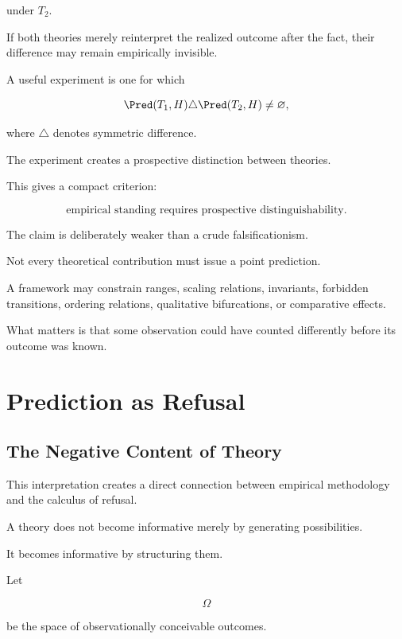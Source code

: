 \documentclass[11pt]{article}
\theoremstyle{remark}
\begin{document}
under $T_2$.

If both theories merely reinterpret the realized outcome after the fact, their difference may remain empirically invisible.

A useful experiment is one for which

\begin{equation}
\Pred(T_1,H)
\triangle
\Pred(T_2,H)
\neq
\varnothing,
\end{equation}

where $\triangle$ denotes symmetric difference.

The experiment creates a prospective distinction between theories.

This gives a compact criterion:

\begin{equation}
\boxed{
\text{empirical standing requires prospective distinguishability}.
}
\end{equation}

The claim is deliberately weaker than a crude falsificationism.

Not every theoretical contribution must issue a point prediction.

A framework may constrain ranges, scaling relations, invariants, forbidden transitions, ordering relations, qualitative bifurcations, or comparative effects.

What matters is that some observation could have counted differently before its outcome was known.

\section{Prediction as Refusal}

\subsection{The Negative Content of Theory}

This interpretation creates a direct connection between empirical methodology and the calculus of refusal.

A theory does not become informative merely by generating possibilities.

It becomes informative by structuring them.

Let

\begin{equation}
\Omega
\end{equation}

be the space of observationally conceivable outcomes.
\end{document}
